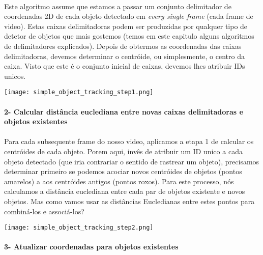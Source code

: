 \paragraph{}
Este algoritmo assume que estamos a passar um conjunto delimitador de coordenadas 2D de cada objeto detectado em \textit{every single frame} (cada frame de video).
\newline
Estas caixas delimitadoras podem ser produzidas por qualquer tipo de detetor de objetos que mais gostemos (temos em este capitulo alguns algoritmos de delimitadores explicados).
\newline
Depois de obtermos as coordenadas das caixas delimitadoras, devemos determinar o centróide, ou simplesmente, o centro da caixa.
\newline
Visto que este é o conjunto inicial de caixas, devemos lhes atribuir IDs unicos.
\begin{center}
  \texttt{[image: simple\_object\_tracking\_step1.png]}
  \label{img:centroid_traking1}  
\end{center}

\paragraph{2- Calcular distância euclediana entre novas caixas delimitadoras e objetos existentes}
\paragraph{}
Para cada subsequente frame do nosso video, aplicamos a etapa 1 de calcular os centróides de cada objeto. Porem aqui, invês de atribuir um ID unico a cada objeto detectado (que iria contrariar o sentido de rastrear um objeto), precisamos determinar primeiro se podemos acociar novos centróides de objetos (pontos amarelos) a aos centróides antigos (pontos roxos). Para este processo, nós calculamos a distância euclediana entre cada par de objetos existente e novos objetos.
\newline
Mas como vamos usar as distâncias Eucledianas entre estes pontos para combiná-los e associá-los? 

\begin{center}
  \texttt{[image: simple\_object\_tracking\_step2.png]}
  \label{img:centroid_traking2}  
\end{center}

\paragraph{3- Atualizar coordenadas para objetos existentes}
